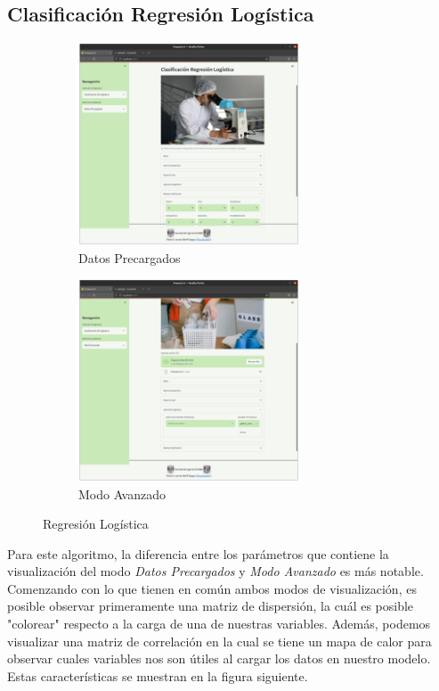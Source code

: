 \documentclass[10pt]{article}
\begin{document}
\subsection{Clasificación Regresión Logística}

    \begin{figure}[H]
    
    \begin{subfigure}{0.5\textwidth}
    \centering
    \includegraphics[height=6cm]{img/RLogisticaDP.png} 
    \caption{Datos Precargados}
    \label{fig:RLDP}
    \end{subfigure}
    \begin{subfigure}{0.5\textwidth}
    \centering
    \includegraphics[height=6cm]{img/RLogisticaMA.png}
    \caption{Modo Avanzado}
    \label{fig:RLMA}
    \end{subfigure}
    
    \caption{Regresión Logística}
    \label{fig:RLogistic}
    \end{figure}
    
    Para este algoritmo, la diferencia entre los parámetros que contiene la visualización del modo \textit{Datos Precargados} y \textit{Modo Avanzado} es más notable. Comenzando con lo que tienen en común ambos modos de visualización, es posible observar primeramente una matriz de dispersión, la cuál es posible "colorear" respecto a la carga de una de nuestras variables. Además, podemos visualizar una matriz de correlación en la cual se tiene un mapa de calor para observar cuales variables nos son útiles al cargar los datos en nuestro modelo. Estas características se muestran en la figura siguiente.
    
\end{document}
